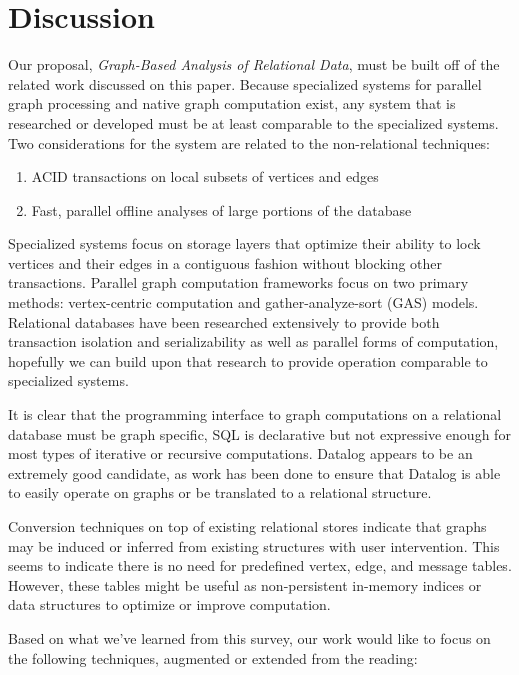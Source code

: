 \documentclass[11pt,letterpaper]{article}
\begin{document}
\section*{Discussion}

Our proposal, \textit{Graph-Based Analysis of Relational Data}, must be built off of the related work discussed on this paper. Because specialized systems for parallel graph processing and native graph computation exist, any system that is researched or developed must be at least comparable to the specialized systems. Two considerations for the system are related to the non-relational techniques:

\begin{enumerate}
	\item ACID transactions on local subsets of vertices and edges
	\item Fast, parallel offline analyses of large portions of the database
\end{enumerate}

Specialized systems focus on storage layers that optimize their ability to lock vertices and their edges in a contiguous fashion without blocking other transactions. Parallel graph computation frameworks focus on two primary methods: vertex-centric computation and gather-analyze-sort (GAS) models. Relational databases have been researched extensively to provide both transaction isolation and serializability as well as parallel forms of computation, hopefully we can build upon that research to provide operation comparable to specialized systems.

It is clear that the programming interface to graph computations on a relational database must be graph specific, SQL is declarative but not expressive enough for most types of iterative or recursive computations. Datalog appears to be an extremely good candidate, as work has been done to ensure that Datalog is able to easily operate on graphs or be translated to a relational structure.

Conversion techniques on top of existing relational stores indicate that graphs may be induced or inferred from existing structures with user intervention. This seems to indicate there is no need for predefined vertex, edge, and message tables. However, these tables might be useful as non-persistent in-memory indices or data structures to optimize or improve computation.

Based on what we've learned from this survey, our work would like to focus on the following techniques, augmented or extended from the reading:
\end{document}
